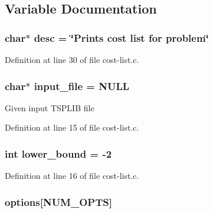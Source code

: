 \subsection{Variable Documentation}
\hypertarget{cost-list_8c_3aad16fd4bea1b9717f232ea75ad6449}{
\subsubsection[{desc}]{\setlength{\rightskip}{0pt plus 5cm}char$\ast$ {\bf desc} = \char`\"{}Prints cost list for problem\char`\"{}}}
\label{cost-list_8c_3aad16fd4bea1b9717f232ea75ad6449}




Definition at line 30 of file cost-list.c.\hypertarget{cost-list_8c_a4f3a15de34c409bdec6ceacf93078ed}{
\subsubsection[{input\_\-file}]{\setlength{\rightskip}{0pt plus 5cm}char$\ast$ {\bf input\_\-file} = NULL}}
\label{cost-list_8c_a4f3a15de34c409bdec6ceacf93078ed}


Given input TSPLIB file 

Definition at line 15 of file cost-list.c.\hypertarget{cost-list_8c_ed7394fd8e0c2796b26b9654fd10fd9d}{
\subsubsection[{lower\_\-bound}]{\setlength{\rightskip}{0pt plus 5cm}int {\bf lower\_\-bound} = -2}}
\label{cost-list_8c_ed7394fd8e0c2796b26b9654fd10fd9d}




Definition at line 16 of file cost-list.c.\hypertarget{cost-list_8c_cea6a9709d519c143f30db401a0d0c72}{
\subsubsection[{options}]{ {\bf options}\mbox{[}NUM\_\-OPTS\mbox{]}}}
\label{cost-list_8c_cea6a9709d519c143f30db401a0d0c72}


